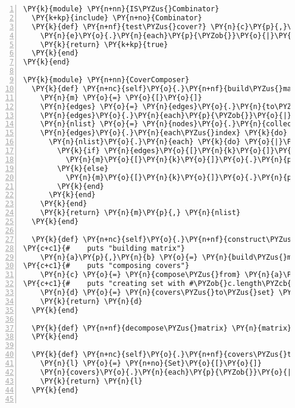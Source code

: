 \begin{Verbatim}[commandchars=\\\{\},numbers=left,firstnumber=1,stepnumber=1,xleftmargin=7mm, fontsize=\small]
\PY{k}{module} \PY{n+nn}{IS\PYZus{}Combinator}
  \PY{k+kp}{include} \PY{n+no}{Combinator}
  \PY{k}{def} \PY{n+nf}{test\PYZus{}cover?} \PY{n}{c}\PY{p}{,}\PY{n}{e}
    \PY{n}{e}\PY{o}{.}\PY{n}{each}\PY{p}{\PYZob{}}\PY{o}{|}\PY{n}{k}\PY{o}{|} \PY{k}{return} \PY{k+kp}{false} \PY{k}{if} \PY{p}{(}\PY{n}{k}\PY{o}{-}\PY{n}{c}\PY{p}{)}\PY{o}{.}\PY{n}{empty?}\PY{p}{\PYZcb{}}
    \PY{k}{return} \PY{k+kp}{true}
  \PY{k}{end}
\PY{k}{end}

\PY{k}{module} \PY{n+nn}{CoverComposer}
  \PY{k}{def} \PY{n+nc}{self}\PY{o}{.}\PY{n+nf}{build\PYZus{}matrix} \PY{n}{nodes}\PY{p}{,} \PY{n}{edges}
    \PY{n}{m} \PY{o}{=} \PY{o}{[}\PY{o}{]}
    \PY{n}{edges} \PY{o}{=} \PY{n}{edges}\PY{o}{.}\PY{n}{to\PYZus{}a}
    \PY{n}{edges}\PY{o}{.}\PY{n}{each}\PY{p}{\PYZob{}}\PY{o}{|}\PY{n}{k}\PY{o}{|} \PY{n}{m}\PY{o}{.}\PY{n}{push}\PY{p}{(}\PY{o}{[}\PY{o}{]}\PY{p}{)}\PY{p}{\PYZcb{}}
    \PY{n}{nlist} \PY{o}{=} \PY{n}{nodes}\PY{o}{.}\PY{n}{collect}\PY{p}{\PYZob{}}\PY{o}{|}\PY{n}{k}\PY{o}{|} \PY{n}{k}\PY{o}{.}\PY{n}{id}\PY{p}{\PYZcb{}}
    \PY{n}{edges}\PY{o}{.}\PY{n}{each\PYZus{}index} \PY{k}{do} \PY{o}{|}\PY{n}{k}\PY{o}{|}
      \PY{n}{nlist}\PY{o}{.}\PY{n}{each} \PY{k}{do} \PY{o}{|}\PY{n}{j}\PY{o}{|}
        \PY{k}{if} \PY{n}{edges}\PY{o}{[}\PY{n}{k}\PY{o}{]}\PY{o}{.}\PY{n}{include?}\PY{p}{(}\PY{n}{j}\PY{p}{)}
          \PY{n}{m}\PY{o}{[}\PY{n}{k}\PY{o}{]}\PY{o}{.}\PY{n}{push}\PY{p}{(}\PY{l+m+mi}{1}\PY{p}{)}
        \PY{k}{else}
          \PY{n}{m}\PY{o}{[}\PY{n}{k}\PY{o}{]}\PY{o}{.}\PY{n}{push}\PY{p}{(}\PY{l+m+mi}{0}\PY{p}{)}
        \PY{k}{end}
      \PY{k}{end}
    \PY{k}{end}
    \PY{k}{return} \PY{n}{m}\PY{p}{,} \PY{n}{nlist}
  \PY{k}{end}

  \PY{k}{def} \PY{n+nc}{self}\PY{o}{.}\PY{n+nf}{construct\PYZus{}covers} \PY{n}{nodes}\PY{p}{,} \PY{n}{edges}
\PY{c+c1}{#    puts "building matrix"}
    \PY{n}{a}\PY{p}{,}\PY{n}{b} \PY{o}{=} \PY{n}{build\PYZus{}matrix} \PY{n}{nodes}\PY{p}{,} \PY{n}{edges}
\PY{c+c1}{#    puts "composing covers"}
    \PY{n}{c} \PY{o}{=} \PY{n}{compose\PYZus{}from} \PY{n}{a}\PY{p}{,}\PY{n}{b}
\PY{c+c1}{#    puts "creating set with #\PYZob{}c.length\PYZcb{} covers"}
    \PY{n}{d} \PY{o}{=} \PY{n}{covers\PYZus{}to\PYZus{}set} \PY{n}{c}
    \PY{k}{return} \PY{n}{d}
  \PY{k}{end}
    
  \PY{k}{def} \PY{n+nf}{decompose\PYZus{}matrix} \PY{n}{matrix}
  \PY{k}{end}
  
  \PY{k}{def} \PY{n+nc}{self}\PY{o}{.}\PY{n+nf}{covers\PYZus{}to\PYZus{}set} \PY{n}{covers}
    \PY{n}{l} \PY{o}{=} \PY{n+no}{Set}\PY{o}{[}\PY{o}{]}
    \PY{n}{covers}\PY{o}{.}\PY{n}{each}\PY{p}{\PYZob{}}\PY{o}{|}\PY{n}{k}\PY{o}{|} \PY{n}{l}\PY{o}{.}\PY{n}{add}\PY{p}{(}\PY{n+no}{Set}\PY{o}{.}\PY{n}{new}\PY{p}{(}\PY{n}{k}\PY{p}{)}\PY{p}{)}\PY{p}{\PYZcb{}}
    \PY{k}{return} \PY{n}{l}
  \PY{k}{end}


\end{Verbatim}
